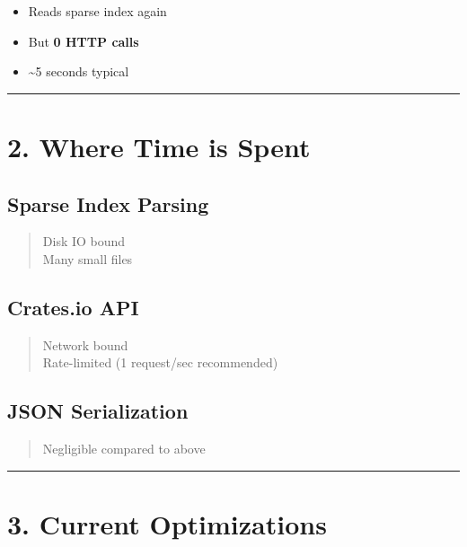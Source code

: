 \documentclass[
  letterpaper,
  DIV=11,
  numbers=noendperiod]{scrreprt}
\providecommand{\tightlist}{%
  \setlength{\itemsep}{0pt}\setlength{\parskip}{0pt}}
\begin{document}
\begin{itemize}
\tightlist
\item
  Reads sparse index again\\
\item
  But \textbf{0 HTTP calls}\\
\item
  \textasciitilde5 seconds typical
\end{itemize}

\begin{center}\rule{0.5\linewidth}{0.5pt}\end{center}

\section{2. Where Time is Spent}\label{where-time-is-spent}

\subsection{Sparse Index Parsing}\label{sparse-index-parsing-1}

\begin{quote}
Disk IO bound\\
Many small files
\end{quote}

\subsection{Crates.io API}\label{crates.io-api}

\begin{quote}
Network bound\\
Rate-limited (1 request/sec recommended)
\end{quote}

\subsection{JSON Serialization}\label{json-serialization}

\begin{quote}
Negligible compared to above
\end{quote}

\begin{center}\rule{0.5\linewidth}{0.5pt}\end{center}

\section{3. Current Optimizations}\label{current-optimizations}
\end{document}
